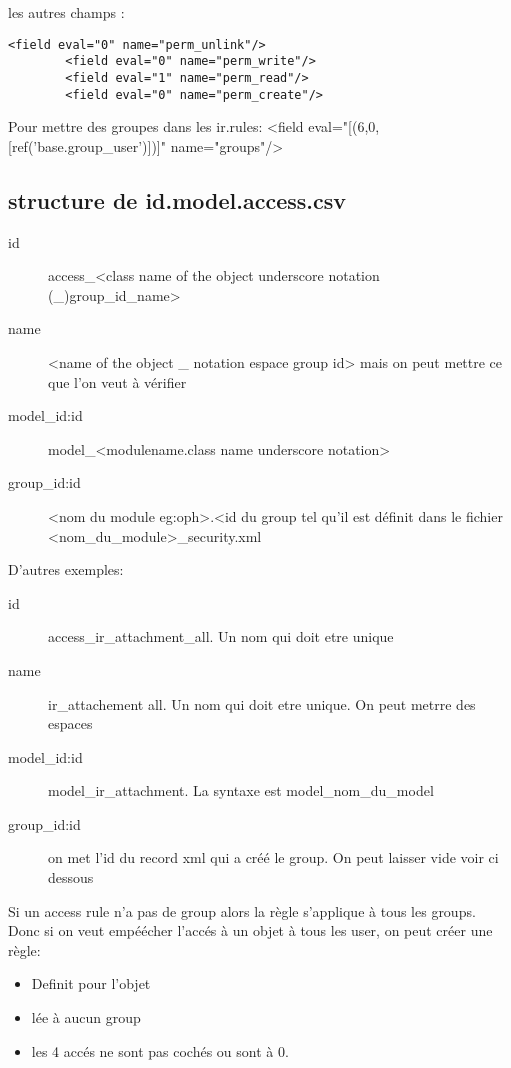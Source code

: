 \documentclass[12pt,a4paper]{article}
\begin{document}
les autres champs :

\begin{verbatim}
<field eval="0" name="perm_unlink"/>
        <field eval="0" name="perm_write"/>
        <field eval="1" name="perm_read"/>
        <field eval="0" name="perm_create"/>
\end{verbatim}           

Pour mettre des groupes dans les ir.rules:
<field eval="[(6,0,[ref('base.group\_user')])]" name="groups"/>
             
\subsection{structure de id.model.access.csv}
\label{sec:struct_csv}

\begin{description}
\item[id] access\_<class name of the object underscore notation (\_)group\_id\_name>
\item[name] <name of the object \_ notation espace group id> mais on peut mettre ce que l'on veut à vérifier
\item[model\_id:id] model\_<modulename.class name underscore notation> 
\item[group\_id:id] <nom du module eg:oph>.<id du group tel qu'il est définit dans le fichier <nom\_du\_module>\_security.xml
\end{description}

D'autres exemples:
\begin{description}
\item[id] access\_ir\_attachment\_all. Un nom qui doit etre unique
\item[name] ir\_attachement all. Un nom qui doit etre unique. On peut metrre des espaces
\item[model\_id:id] model\_ir\_attachment. La syntaxe est model\_nom\_du\_model
\item[group\_id:id] on met l'id du record xml qui a créé le group. On peut laisser vide voir ci dessous
\end{description}
Si un access rule n'a pas de group alors la règle s'applique à tous les groups. Donc si on veut empéécher l'accés à un objet à tous les user, on peut créer une règle:
\begin{itemize}
\item Definit pour l'objet
\item lée à aucun group
\item les 4 accés ne sont pas cochés ou sont à 0.
\end{itemize}
\end{document}

